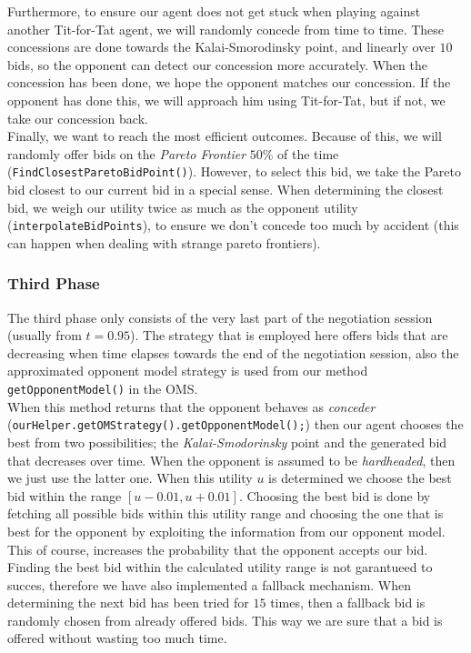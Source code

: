 Furthermore, to ensure our agent does not get stuck when playing against 
another Tit-for-Tat agent, we will randomly concede from time to time. 
These concessions are done towards the Kalai-Smorodinsky point, and linearly over 
$10$ bids, so the opponent can detect our concession more accurately. When the concession has been done, we hope the opponent matches  our concession. If the opponent has done this, we will approach him using Tit-for-Tat, but if not, we take our concession back. \\

Finally, we want to reach the most efficient outcomes. Because of this,
we will randomly offer bids on the \emph{Pareto Frontier} $50\%$ of the time (\verb-FindClosestParetoBidPoint()-).
However, to select this bid, we take the Pareto bid closest to our current bid in a special sense.
When determining the closest bid, we weigh our utility twice as much
as the opponent utility (\verb-interpolateBidPoints-), to ensure we don't concede too much by accident 
(this can happen when dealing with strange pareto frontiers).

\subsubsection{Third Phase}

The third phase only consists of the very last part of the negotiation session (usually from $t=0.95$). The strategy that is employed here offers bids that are decreasing when time elapses towards the end of the negotiation session, also the approximated opponent model strategy is used from our method \texttt{getOpponentModel()} in the OMS. \\

When this method returns that the opponent behaves as \emph{conceder} (\verb-ourHelper.getOMStrategy().getOpponentModel();-) then our agent chooses the best from two possibilities; the \emph{Kalai-Smodorinsky} point and the generated bid that decreases over time. When the opponent is assumed to be \emph{hardheaded}, then we just use the latter one. When this utility $u$ is determined we choose the best bid within the range $[u-0.01, u+0.01]$. Choosing the best bid is done by fetching all possible bids within this utility range and choosing the one that is best for the opponent by exploiting the information from our opponent model. This of course, increases the probability that the opponent accepts our bid. \\

Finding the best bid within the calculated utility range is not garantueed to succes, therefore we have also implemented a fallback mechanism. When determining the next bid has been tried for $15$ times, then a fallback bid is randomly chosen from already offered bids. This way we are sure that a bid is offered without wasting too much time.

